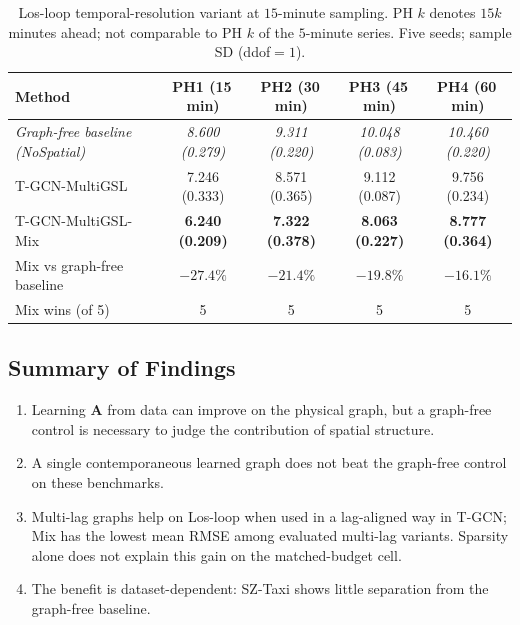 \begin{table}[t]
\centering
\caption{Los-loop temporal-resolution variant at $15$-minute sampling.
PH $k$ denotes $15k$ minutes ahead; not comparable to PH $k$ of the
$5$-minute series. Five seeds; sample SD (ddof$=1$).}
\label{tab:los15}
\small
\begin{tabular}{lcccc}
\toprule
Method & PH1 (15\,min) & PH2 (30\,min) & PH3 (45\,min) & PH4 (60\,min) \\
\midrule
\textit{Graph-free baseline (NoSpatial)} & \textit{8.600 (0.279)} & \textit{9.311 (0.220)} & \textit{10.048 (0.083)} & \textit{10.460 (0.220)} \\
\midrule
T-GCN-MultiGSL & 7.246 (0.333) & 8.571 (0.365) & 9.112 (0.087) & 9.756 (0.234) \\
T-GCN-MultiGSL-Mix & \textbf{6.240 (0.209)} & \textbf{7.322 (0.378)} & \textbf{8.063 (0.227)} & \textbf{8.777 (0.364)} \\
\midrule
Mix vs graph-free baseline & $-27.4\%$ & $-21.4\%$ & $-19.8\%$ & $-16.1\%$ \\
Mix wins (of 5) & 5 & 5 & 5 & 5 \\
\bottomrule
\end{tabular}
\end{table}

\subsection{Summary of Findings}\label{sec:res-summary}

\begin{enumerate}
\item Learning $\mathbf{A}$ from data can improve on the physical graph,
but a graph-free control is necessary to judge the contribution of spatial
structure.
\item A single contemporaneous learned graph does not beat the graph-free
control on these benchmarks.
\item Multi-lag graphs help on Los-loop when used in a lag-aligned way in
T-GCN; Mix has the lowest mean RMSE among evaluated multi-lag variants.
Sparsity alone does not explain this gain on the matched-budget cell.
\item The benefit is dataset-dependent: SZ-Taxi shows little separation
from the graph-free baseline.
\end{enumerate}


